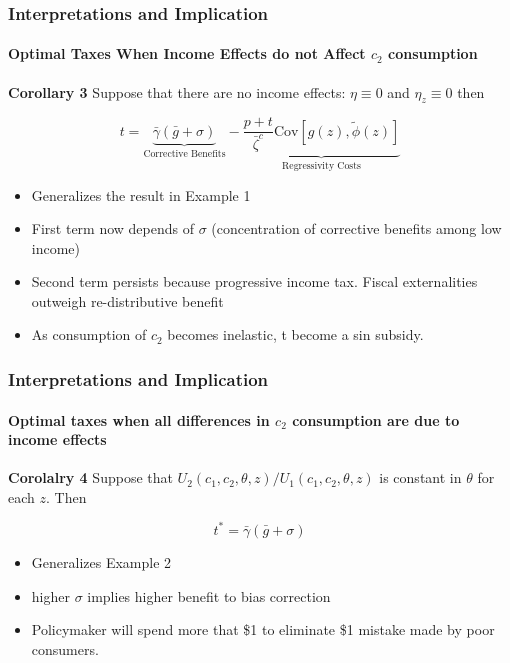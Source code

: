 \documentclass{beamer}
\newcommand{\Cov}{\mathrm{Cov}}
\begin{document}
\begin{frame}
\frametitle{Interpretations and Implication}
\framesubtitle{ Optimal Taxes When Income Effects do not Affect $c_2$ consumption}

\textbf{Corollary 3} Suppose that there are no income effects: $\eta \equiv 0$ and $\eta_z \equiv 0 $ then 

$$ t = \underbrace{\bar{\gamma}(\bar{g} + \sigma)}_\text{Corrective Benefits} -  \underbrace{\frac{p + t}{\bar{\zeta}^c} \Cov \left[ g(z), \tilde{\phi}(z)  \right]}_\text{Regressivity Costs} $$

\begin{itemize}
	\item Generalizes the result in Example 1
	\item First term now depends of $\sigma$ (concentration of corrective benefits among low income)
	\item Second term persists because progressive income tax. Fiscal externalities outweigh re-distributive benefit 
	\item As consumption of $c_2$ becomes inelastic, t become a sin subsidy. 
\end{itemize}
\end{frame}






\begin{frame}
\frametitle{Interpretations and Implication}
\framesubtitle{Optimal taxes when all differences in $c_2$ consumption are due to income effects }

\textbf{Corolalry 4} Suppose that $U_2(c_1,c_2, \theta, z) / U_1(c_1,c_2, \theta, z)$ is constant in $\theta$ for each $z$. Then 

$$ t^* = \bar{\gamma}(\bar{g} + \sigma)$$

\begin{itemize}
	\item Generalizes Example 2 
	\item higher $\sigma$ implies higher benefit to bias correction
	\item Policymaker will spend more that \$1 to eliminate \$1 mistake made by poor consumers. 
\end{itemize}
\end{frame}
\end{document}
